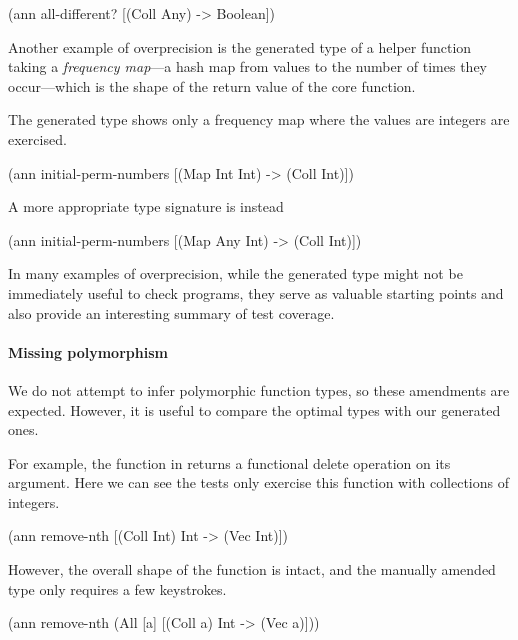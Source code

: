 \begin{cljlisting}
(ann all-different? [(Coll Any) -> Boolean])
\end{cljlisting}

Another example of overprecision is the generated type
of  a helper function
taking a \emph{frequency map}---a hash map from values
to the number of times they occur---which is the shape
of the return value of the core 
function.

The generated type shows only a frequency map where
the values are integers are exercised.

\begin{cljlisting}
(ann initial-perm-numbers
  [(Map Int Int) -> (Coll Int)])
\end{cljlisting}

A more appropriate type signature is instead

\begin{cljlisting}
(ann initial-perm-numbers
  [(Map Any Int) -> (Coll Int)])
\end{cljlisting}

In many examples of overprecision, while the generated
type might not be immediately useful to check programs,
they serve as valuable starting points and also provide
an interesting summary of test coverage.

\paragraph{Missing polymorphism}

We do not attempt to infer polymorphic function types, 
so these amendments are expected. However, it is useful
to compare the optimal types with our generated ones.

For example, the  function in 
returns a functional delete operation on its argument.
Here we can see the tests only exercise this function with
collections of integers.

\begin{cljlisting}
(ann remove-nth [(Coll Int) Int -> (Vec Int)])
\end{cljlisting}

However, the overall shape of the function is intact,
and the manually amended type only requires a few 
keystrokes.

\begin{cljlisting}
(ann remove-nth
  (All [a] [(Coll a) Int -> (Vec a)]))
\end{cljlisting}


